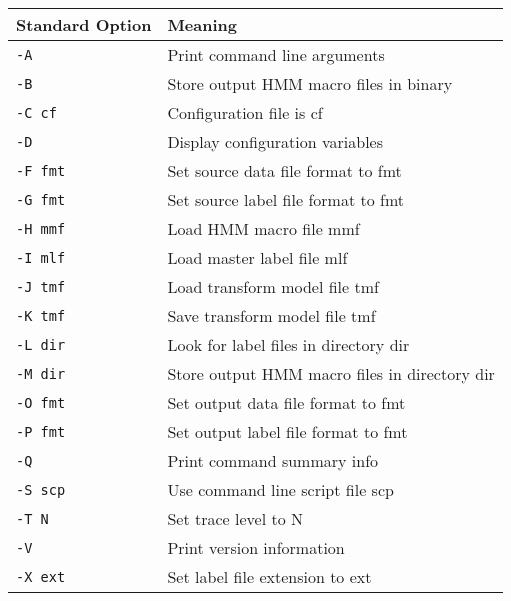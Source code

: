 \vspace*{1cm}
\begin{center}
\begin{tabular}{|p{2.6cm}|p{8.2cm}|} \hline
Standard Option &   Meaning  \\ \hline
\texttt{-A}     &   Print command line arguments\\
\texttt{-B}     &  Store output HMM macro files in binary \\
\texttt{-C cf}  &   Configuration file is cf \\
\texttt{-D}     &   Display configuration variables\\
\texttt{-F fmt}  &  Set source data file format to fmt \\
\texttt{-G fmt}  &  Set source label file format to fmt \\
\texttt{-H mmf}  &  Load HMM macro file mmf \\
\texttt{-I mlf}  &  Load master label file mlf \\
\texttt{-J tmf}  &  Load transform model file tmf \\
\texttt{-K tmf}  &  Save transform model file tmf \\
\texttt{-L dir}  &  Look for label files in directory dir \\
\texttt{-M dir}  &  Store output HMM macro files in directory dir \\
\texttt{-O fmt}  &  Set output data file format to fmt \\
\texttt{-P fmt}  &  Set output label file format to fmt \\
\texttt{-Q}     &   Print command summary info\\
\texttt{-S scp}  &   Use command line script file scp \\
\texttt{-T N}  &   Set trace level to N \\
\texttt{-V}     &   Print version information\\
\texttt{-X ext} &   Set label file extension to ext \\ \hline
\end{tabular}
\end{center}


